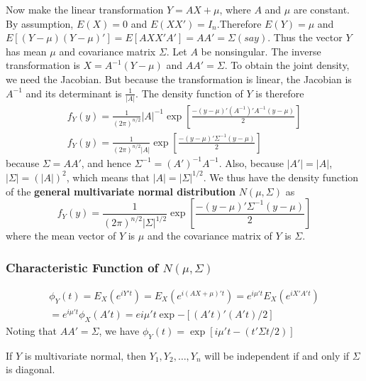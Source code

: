 \documentclass{article}
\begin{document}
Now make the linear transformation \(Y=AX+\mu\), where \(A\) and \(\mu\) are constant. By assumption, \(E(X)=0\) and \(E(XX')=I_n\).Therefore \(E(Y)=\mu\) and \(E[(Y-\mu)(Y-\mu)']=E[AXX'A']=AA'=\Sigma (say)\). Thus the vector \(Y\) has mean \(\mu\) and covariance matrix \(\Sigma\). Let \(A\) be nonsingular. The inverse transformation is \(X=A^{-1}(Y-\mu)\) and \(AA'=\Sigma\). To obtain the joint density, we need the Jacobian. But because the transformation is linear, the Jacobian is \(A^{-1}\) and its determinant is \(\frac{1}{|A|}\). The density function of \(Y\) is therefore
\begin{equation*}
\begin{split}
    f_Y(y)=\frac{1}{(2\pi)^{n/2}} |A|^{-1} \exp{\left[\frac{-(y-\mu)'(A^{-1})'A^{-1}(y-\mu)}{2} \right]}\\
    f_Y(y)=\frac{1}{(2\pi)^{n/2}|A|}  \exp{\left[\frac{-(y-\mu)'\Sigma^{-1}(y-\mu)}{2} \right]}
\end{split}    
\end{equation*}
because \(\Sigma=AA'\), and hence \(\Sigma^{-1}=(A')^{-1}A^{-1}\). Also, because \(|A'|=|A|\), \(|\Sigma|=(|A|)^2\), which means that \(|A|=|\Sigma|^{1/2}\). We thus have the density function of the \textbf{general multivariate normal distribution} \(N(\mu,\Sigma)\) as
\begin{equation*}
     f_Y(y)=\frac{1}{(2\pi)^{n/2}|\Sigma|^{1/2}}  \exp{\left[\frac{-(y-\mu)'\Sigma^{-1}(y-\mu)}{2} \right]}
\end{equation*}
where the mean vector of \(Y\) is \(\mu\) and the covariance matrix of \(Y\) is \(\Sigma\).

\subsubsection{Characteristic Function of \(N(\mu,\Sigma)\)}

\begin{equation*}
    \begin{split}
    \phi_Y(t)=E_X(e^{iY't})=E_X(e^{i(AX+\mu)'t})=e^{i \mu't}E_X(e^{iX'A't})\\
    =e^{i\mu't}\phi_X(A't)=e{i\mu't}\exp{-[(A't)'(A't)/2]}
    \end{split}
\end{equation*}
Noting that \(AA'=\Sigma\), we have \(\phi_Y(t)=\exp{[i\mu't-(t'\Sigma t/2)]}\)

\begin{property}
    If \(Y\) is multivariate normal, then \(Y_1,Y_2,\dots,Y_n\) will be independent if and only if \(\Sigma\) is diagonal.
\end{property}
\end{document}
